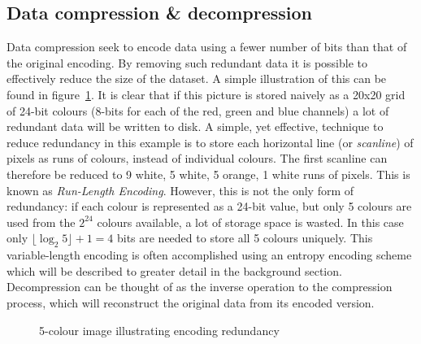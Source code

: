 \subsection{Data compression \& decompression}
Data compression seek to encode data using a fewer number of bits than that of the original encoding. By removing such redundant data it is possible to effectively 
reduce the size of the dataset. A simple illustration of this can be found in figure~\ref{COMP_ILLUS}. It is clear that if this picture is stored naively as a 20x20
grid of 24-bit colours (8-bits for each of the red, green and blue channels) a lot of redundant data will be written to disk. A simple, yet effective, technique to 
reduce redundancy in this example is to store each horizontal line (or \textit{scanline}) of pixels as runs of colours, instead of individual colours. The first 
scanline can therefore be reduced to 9 white, 5 white, 5 orange, 1 white runs of pixels. This is known as \textit{Run-Length Encoding}. However, this is not the only 
form of redundancy: if each colour is represented as a 24-bit value, but only 5 colours are used from the $2^{24}$ colours available, a lot of storage space is wasted. 
In this case only  $\lfloor\log_{2}{5}\rfloor+1 = 4$ bits are needed to store all 5 colours uniquely. This variable-length encoding is often accomplished using an 
entropy encoding scheme which will be described to greater detail in the background section. Decompression can be thought of as the inverse operation to the compression 
process, which will reconstruct the original data from its encoded version.
\begin{figure}[ht!]
\begin{mdframed}
  \centering
 \caption{5-colour image illustrating encoding redundancy}
 \label{COMP_ILLUS}
\end{mdframed}
\end{figure}
